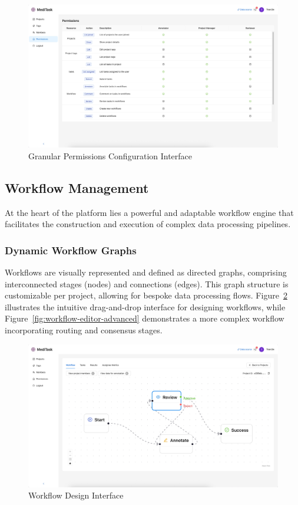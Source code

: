 \begin{figure}[h!]
    \centering
    \includegraphics[width=1\textwidth]{content//resources//features//permissions.png}
    \caption{Granular Permissions Configuration Interface}
    \label{fig:permissions-config}
\end{figure}

\subsection{Workflow Management}
At the heart of the platform lies a powerful and adaptable workflow engine that facilitates the construction and execution of complex data processing pipelines.

\subsubsection{Dynamic Workflow Graphs}
Workflows are visually represented and defined as directed graphs, comprising interconnected stages (nodes) and connections (edges). This graph structure is customizable per project, allowing for bespoke data processing flows. Figure~\ref{fig:workflow-editor-simple} illustrates the intuitive drag-and-drop interface for designing workflows, while Figure~\ref{fig:workflow-editor-advanced} demonstrates a more complex workflow incorporating routing and consensus stages.

\begin{figure}[h!]
    \centering
    \includegraphics[width=1\textwidth]{content/resources/features/simple workflow.png}
    \caption{Workflow Design Interface}
    \label{fig:workflow-editor-simple}
\end{figure}

